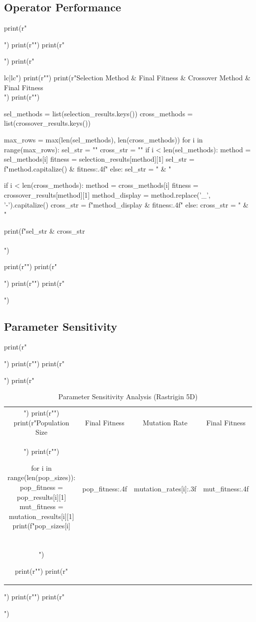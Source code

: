 \documentclass[a4paper, 11pt]{article}
\begin{document}
\subsection{Operator Performance}

\begin{pycode}
print(r"\begin{table}[htbp]")
print(r"\centering")
print(r"\caption{Selection and Crossover Method Performance on Rastrigin (5D, 200 generations)}")
print(r"\begin{tabular}{lc|lc}")
print(r"\toprule")
print(r"Selection Method & Final Fitness & Crossover Method & Final Fitness \\")
print(r"\midrule")

sel_methods = list(selection_results.keys())
cross_methods = list(crossover_results.keys())

max_rows = max(len(sel_methods), len(cross_methods))
for i in range(max_rows):
    sel_str = ""
    cross_str = ""
    if i < len(sel_methods):
        method = sel_methods[i]
        fitness = selection_results[method][1]
        sel_str = f"{method.capitalize()} & {fitness:.4f}"
    else:
        sel_str = " & "

    if i < len(cross_methods):
        method = cross_methods[i]
        fitness = crossover_results[method][1]
        method_display = method.replace('_', '-').capitalize()
        cross_str = f"{method_display} & {fitness:.4f}"
    else:
        cross_str = " & "

    print(f"{sel_str} & {cross_str} \\\\")

print(r"\bottomrule")
print(r"\end{tabular}")
print(r"\label{tab:operators}")
print(r"\end{table}")
\end{pycode}

\subsection{Parameter Sensitivity}

\begin{pycode}
print(r"\begin{table}[htbp]")
print(r"\centering")
print(r"\caption{Parameter Sensitivity Analysis (Rastrigin 5D)}")
print(r"\begin{tabular}{cc|cc}")
print(r"\toprule")
print(r"Population Size & Final Fitness & Mutation Rate & Final Fitness \\")
print(r"\midrule")

for i in range(len(pop_sizes)):
    pop_fitness = pop_results[i][1]
    mut_fitness = mutation_results[i][1]
    print(f"{pop_sizes[i]} & {pop_fitness:.4f} & {mutation_rates[i]:.3f} & {mut_fitness:.4f} \\\\")

print(r"\bottomrule")
print(r"\end{tabular}")
print(r"\label{tab:parameters}")
print(r"\end{table}")
\end{pycode}
\end{document}
